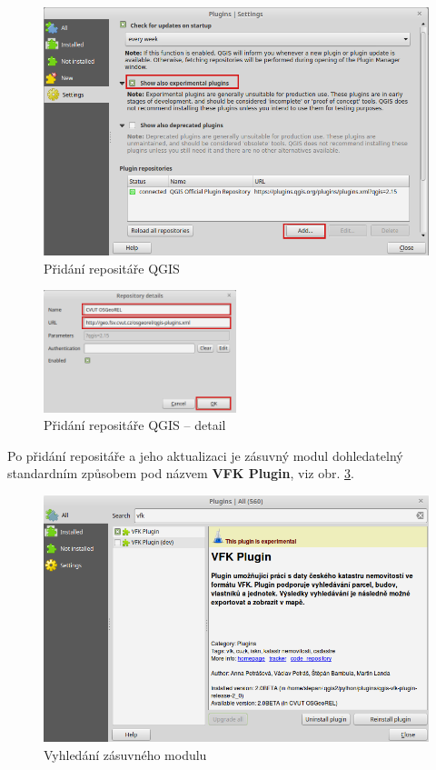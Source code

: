 \documentclass[a4paper,12pt,oneside]{book}
\begin{document}
\begin{figure}[htb]
\centering
\includegraphics[width=1\textwidth]{images/qgis_repo_plugins.png}
\caption[Přidání repositáře QGIS]{Přidání repositáře QGIS}
\label{l_qgis_plugins}
\end{figure}

\begin{figure}[htb]
\centering
\includegraphics[width=0.5\textwidth]{images/qgis_repo_detail.png}
\caption[Přidání repositáře QGIS -- detail]{Přidání repositáře QGIS -- detail}
\label{l_repo_detail}
\end{figure}

Po přidání repositáře a jeho aktualizaci je zásuvný modul dohledatelný standardním způsobem pod názvem \textbf{VFK Plugin}, viz obr. \ref{l_qgis_hledani_pluginu}.

\begin{figure}[htb]
\centering
\includegraphics[width=1\textwidth]{images/qgis_plugin_vyhledani.png}
\caption[Vyhledání zásuvného modulu]{Vyhledání zásuvného modulu}
\label{l_qgis_hledani_pluginu}
\end{figure}
\end{document}

